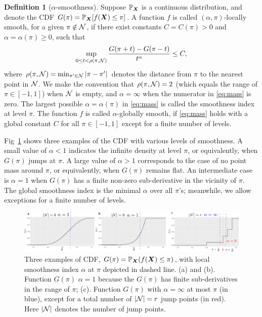 \documentclass[aos]{imsart}
\theoremstyle{definition}
\newtheorem{definition}{Definition}
\begin{document}
\begin{definition} [$\alpha$-smoothness] \label{ass:decboundary} 
Suppose $\mathbb{P}_{\bm X}$ is a continuous distribution, and denote the CDF $G(\pi)=\mathbb{P}_{\bm X}[f(\bm X)\leq \pi]$. A function $f$ is called $(\alpha,\pi)$-locally smooth, for a given $\pi \notin \mathcal{N}$, if there exist constants $C=C(\pi)>0$ and $\alpha=\alpha(\pi)\geq 0$, such that
\begin{equation}\label{eq:mass}
\sup_{0\leq t<\rho(\pi, \tN)}{G(\pi+t)-G(\pi-t)\over t^{\alpha}}\leq C,
\end{equation}
where $\rho(\pi,\mathcal{N}) = \min_{\pi'\in \mathcal{N}} |\pi-\pi'|$ denotes the distance from $\pi$ to the nearest point in $\mathcal{N}$. We make the convention that $\rho(\pi,\mathcal{N})=2$ (which equals the range of $\pi\in[-1,1]$) when $\mathcal{N}$ is empty, and $\alpha=\infty$ when the numerator in \eqref{eq:mass} is zero. The largest possible $\alpha=\alpha(\pi)$ in \eqref{eq:mass} is called the smoothness index at level $\pi$. The function $f$ is called $\alpha$-globally smooth, if \eqref{eq:mass} holds with a global constant $C$ for all $\pi\in[-1,1]$ except for a finite number of levels.
\end{definition}

\noindent
Fig~\ref{fig:CDF} shows three examples of the CDF with various levels of smoothness. A small value of $\alpha<1$ indicates the infinite density at level $\pi$, or equivalently, when $G(\pi)$ jumps at $\pi$. A large value of $\alpha>1$ corresponds to the case of no point mass around $\pi$, or equivalently, when $G(\pi)$ remains flat. An intermediate case is $\alpha=1$ when $G(\pi)$ has a finite non-zero sub-derivative in the vicinity of $\pi$. The global smoothness index is the minimal $\alpha$ over all $\pi$'s; meanwhile, we allow exceptions for a finite number of levels. 

\begin{figure}[t]
\includegraphics[width=.95\textwidth]{figure/cdf_new.pdf}
\caption{Three examples of CDF, $G(\pi)=\mathbb{P}_{\bm X}(f(\bm X)\leq \pi)$, with local smoothness index $\alpha$ at $\pi$ depicted in dashed line. (a) and (b). Function $G(\pi)$ $\alpha=1$ because the $G(\pi)$ has finite sub-derivatives in the range of $\pi$; (c). Function $G(\pi)$ with $\alpha=\infty$ at most $\pi$ (in blue), except for a total number of $|\mathcal{N}|=r$ jump points (in red). Here $|\mathcal{N}|$ denotes the number of jump points.}
\label{fig:CDF}
\end{figure}
\end{document}
